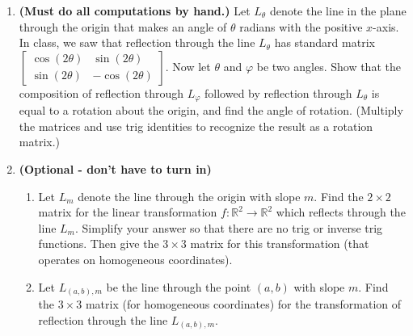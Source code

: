 \documentclass{article}
\newcommand{\R}{\mathbb{R}}
\begin{document}
\begin{enumerate}
	\item \textbf{(Must do all computations by hand.)} Let $L_\theta$ denote the line in the plane through the origin that makes an angle of $\theta$ radians with the positive $x$-axis.  In class, we saw that reflection through the line $L_\theta$ has standard matrix $\begin{bmatrix}
	\cos(2\theta) & \sin(2\theta)\\
	\sin(2\theta) & -\cos(2\theta)
	\end{bmatrix}$.  Now let $\theta$ and $\varphi$ be two angles.  Show that the composition of reflection through $L_\varphi$ followed by reflection through $L_\theta$ is equal to a rotation about the origin, and find the angle of rotation.  (Multiply the matrices and use trig identities to recognize the result as a rotation matrix.)

	\item \textbf{(Optional - don't have to turn in)}  
	\begin{enumerate}
		\item Let $L_m$ denote the line through the origin with slope $m$.  Find the $2 \times 2$ matrix for the linear transformation $f: \R^2 \to \R^2$ which reflects through the line $L_m$.  Simplify your answer so that there are no trig or inverse trig functions.  Then give the $3 \times 3$ matrix for this transformation (that operates on homogeneous coordinates).
		\item Let $L_{(a,b),m}$ be the line through the point $(a,b)$ with slope $m$.  Find the $3 \times 3$ matrix (for homogeneous coordinates) for the transformation of reflection through the line $L_{(a,b),m}$.
	\end{enumerate}  

\end{enumerate}
\end{document}
